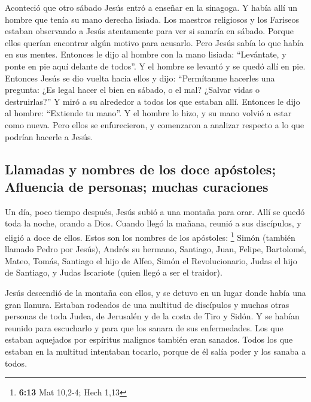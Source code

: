  Aconteció que otro sábado Jesús entró a enseñar en la
sinagoga. Y había allí un hombre que tenía su mano derecha lisiada.
 Los maestros religiosos y los Fariseos estaban observando
a Jesús atentamente para ver si sanaría en sábado. Porque ellos querían
encontrar algún motivo para acusarlo.  Pero Jesús sabía lo
que había en sus mentes. Entonces le dijo al hombre con la mano lisiada:
``Levántate, y ponte en pie aquí delante de todos''. Y el hombre se
levantó y se quedó allí en pie.  Entonces Jesús se dio
vuelta hacia ellos y dijo: ``Permítanme hacerles una pregunta: ¿Es legal
hacer el bien en sábado, o el mal? ¿Salvar vidas o destruirlas?''
 Y miró a su alrededor a todos los que estaban allí.
Entonces le dijo al hombre: ``Extiende tu mano''. Y el hombre lo hizo, y
su mano volvió a estar como nueva.  Pero ellos se
enfurecieron, y comenzaron a analizar respecto a lo que podrían hacerle
a Jesús.

\hypertarget{llamadas-y-nombres-de-los-doce-apuxf3stoles-afluencia-de-personas-muchas-curaciones}{%
\subsection{Llamadas y nombres de los doce apóstoles; Afluencia de
personas; muchas
curaciones}\label{llamadas-y-nombres-de-los-doce-apuxf3stoles-afluencia-de-personas-muchas-curaciones}}

 Un día, poco tiempo después, Jesús subió a una montaña
para orar. Allí se quedó toda la noche, orando a Dios. 
Cuando llegó la mañana, reunió a sus discípulos, y eligió a doce de
ellos. Estos son los nombres de los apóstoles: \footnote{\textbf{6:13}
  Mat 10,2-4; Hech 1,13}  Simón (también llamado Pedro
por Jesús), Andrés su hermano, Santiago, Juan, Felipe, Bartolomé,
 Mateo, Tomás, Santiago el hijo de Alfeo, Simón el
Revolucionario,  Judas el hijo de Santiago, y Judas
Iscariote (quien llegó a ser el traidor).

 Jesús descendió de la montaña con ellos, y se detuvo en
un lugar donde había una gran llanura. Estaban rodeados de una multitud
de discípulos y muchas otras personas de toda Judea, de Jerusalén y de
la costa de Tiro y Sidón. Y se habían reunido para escucharlo y para que
los sanara de sus enfermedades.  Los que estaban
aquejados por espíritus malignos también eran sanados. 
Todos los que estaban en la multitud intentaban tocarlo, porque de él
salía poder y los sanaba a todos.

